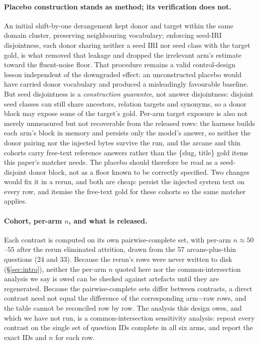\documentclass[10pt,twocolumn]{article}
\begin{document}
\paragraph{Placebo construction stands as method; its verification does not.} An initial shift-by-one derangement kept donor and target within the same domain cluster, preserving neighbouring vocabulary; enforcing seed-IRI disjointness, each donor sharing neither a seed IRI nor seed class with the target gold, is what removed that leakage and dropped the irrelevant arm's estimate toward the fluent-noise floor. That procedure remains a valid control-design lesson independent of the downgraded effect: an unconstructed placebo would have carried donor vocabulary and produced a misleadingly favourable baseline. But seed disjointness is a \emph{construction guarantee}, not answer disjointness: disjoint seed classes can still share ancestors, relation targets and synonyms, so a donor block may expose some of the target's gold. Per-arm target exposure is also not merely unmeasured but not recoverable from the released rows: the harness builds each arm's block in memory and persists only the model's answer, so neither the donor pairing nor the injected bytes survive the run, and the arcane and thin cohorts carry free-text reference answers rather than the \{slug, title\} gold items this paper's matcher needs. The placebo should therefore be read as a seed-disjoint donor block, not as a floor known to be correctly specified. Two changes would fix it in a rerun, and both are cheap: persist the injected system text on every row, and itemise the free-text gold for these cohorts so the same matcher applies.

\paragraph{Cohort, per-arm $n$, and what is released.} Each contrast is computed on its own pairwise-complete set, with per-arm $n\approx50$--$55$ after the rerun eliminated attrition, drawn from the 57 arcane-plus-thin questions (24 and 33). Because the rerun's rows were never written to disk (\S\ref{sec:intro}), neither the per-arm $n$ quoted here nor the common-intersection analysis we say is owed can be checked against artefacts until they are regenerated. Because the pairwise-complete sets differ between contrasts, a direct contrast need not equal the difference of the corresponding arm$-$raw rows, and the table cannot be reconciled row by row. The analysis this design owes, and which we have not run, is a common-intersection sensitivity analysis: repeat every contrast on the single set of question IDs complete in all six arms, and report the exact IDs and $n$ for each row.
\end{document}
